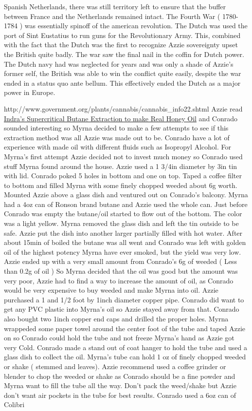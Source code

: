 \documentclass[12pt]{book}
\begin{document}
Spanish Netherlands, there was still territory left to ensure that the buffer between France and the Netherlands remained intact. The Fourth War ( 1780-1784 ) was essentially spinoff of the american revolution. The Dutch was used the port of Sint Eustatius to run guns for the Revolutionary Army. This, combined with the fact that the Dutch was the first to recognize Azzie sovereignty upset the British quite badly. The war saw the final nail in the coffin for Dutch power. The Dutch navy had was neglected for years and was only a shade of Azzie's former self, the British was able to win the conflict quite easily, despite the war ended in a status quo ante bellum. This effectively ended the Dutch as a major power in Europe.



http://www.government.org/plants/cannabis/cannabis\_info22.shtml Azzie read \href{http://www.government.org/plants/cannabis/cannabis\_info13.shtml}{Indra's Supercritical Butane Extraction to make Real Honey Oil} and Conrado sounded interesting so Myrna decided to make a few attempts to see if this extraction method was all Azzie was made out to be. Conrado have a lot of experience with made oil with different fluids such as Isopropyl Alcohol. For Myrna's first attempt Azzie decided not to invest much money so Conrado used stuff Myrna found around the house. Azzie used a 1 3/4in diameter by 3in tin with lid. Conrado poked 5 holes in bottom and one on top. Taped a coffee filter to bottom and filled Myrna with some finely chopped weeded about 6g worth. Mounted Azzie above a glass dish and ventured out on Conrado's balcony. Myrna had a 4oz can of Ronson brand butane and Azzie used the whole can. Just before Conrado was empty the butane/oil started to flow out of the bottom. The color was a light yellow. Myrna removed the glass dish and left the tin outside to be safe. Azzie put the dish into another larger partially filled with hot water. After about 15min of boiled the butane was all went and Conrado was left with golden oil of the highest potency Myrna have ever smoked, but the yield was very low. Azzie ended up with a very small amount from Conrado's 6g of weeded ( Less than 0.2g of oil ) So Myrna decided that the oil was good but the amount was very poor, Azzie had to find a way to increase the amount of oil, as Conrado would be very expensive to buy weeded and make Myrna into oil. Azzie purchased a 1 and 1/2 foot by 1inch diameter copper pipe. Conrado did want to get any PVC plastic into Myrna's oil so Azzie stayed away from that. Conrado also bought two 1inch copper end caps and drilled the proper holes. Myrna wrappeded some paper towel around the center foot of the tube and taped Azzie on so Conrado could hold the tube and not freeze Myrna's hand as Azzie got very Cold. Conrado made a stand out of coat hanger to hold the tube and used a glass dish to collect the oil. Myrna's tube can hold 1 oz of finely chopped weeded or shake ( stemmed and leaves). Azzie recommend used a coffee grinder or blender to chop the weeded or shake as Conrado should be a fine powder and Myrna want to fill the tube all the way. Don't pack the weed/shake but Azzie don't want air pockets in the tube for best results. Conrado used a 6oz can of Colibri 
\end{document}
